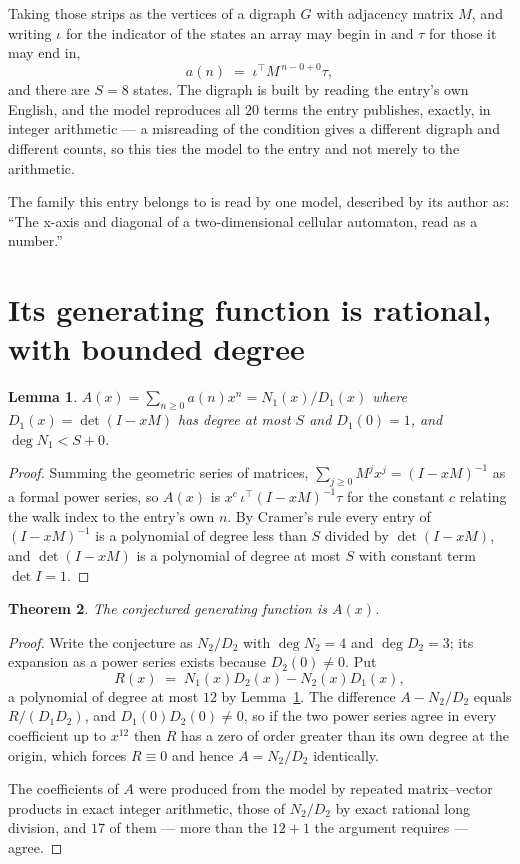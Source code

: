 \documentclass[11pt,a4paper]{article}
\theoremstyle{plain}
\newtheorem{theorem}{Theorem}
\newtheorem{lemma}[theorem]{Lemma}
\theoremstyle{definition}
\begin{document}
Taking those strips as the vertices of a digraph $G$ with adjacency matrix $M$, and writing
$\iota$ for the indicator of the states an array may begin in and $\tau$ for those it may end
in,
\[
a(n)\;=\;\iota^{\!\top}M^{\,n-0+0}\tau ,
\]
and there are $S=8$ states. The digraph is built by reading the entry's own English, and the
model reproduces all $20$ terms the entry publishes, exactly, in integer arithmetic --- a
misreading of the condition gives a different digraph and different counts, so this ties the
model to the entry and not merely to the arithmetic.

The family this entry belongs to is read by one model, described by its author as: ``The x-axis and diagonal of a two-dimensional cellular automaton, read as a number.''


\section{Its generating function is rational, with bounded degree}

\begin{lemma}\label{lem:rat}
$A(x)=\sum_{n\ge0}a(n)x^n=N_1(x)/D_1(x)$ where $D_1(x)=\det(I-xM)$ has degree at most
$S$ and $D_1(0)=1$, and $\deg N_1<S+0$.
\end{lemma}

\begin{proof}
Summing the geometric series of matrices, $\sum_{j\ge0}M^jx^j=(I-xM)^{-1}$ as a formal
power series, so $A(x)$ is $x^{c}\,\iota^{\!\top}(I-xM)^{-1}\tau$ for the constant $c$
relating the walk index to the entry's own $n$. By Cramer's rule every entry of
$(I-xM)^{-1}$ is a polynomial of degree less than $S$ divided by $\det(I-xM)$, and
$\det(I-xM)$ is a polynomial of degree at most $S$ with constant term $\det I=1$.
\end{proof}

\begin{theorem}
The conjectured generating function is $A(x)$.
\end{theorem}

\begin{proof}
Write the conjecture as $N_2/D_2$ with $\deg N_2=4$ and $\deg D_2=3$; its expansion as a
power series exists because $D_2(0)\neq0$. Put
\[
R(x)\;=\;N_1(x)D_2(x)-N_2(x)D_1(x),
\]
a polynomial of degree at most $12$ by Lemma~\ref{lem:rat}. The difference
$A-N_2/D_2$ equals $R/(D_1D_2)$, and $D_1(0)D_2(0)\neq0$, so if the two power series agree in
every coefficient up to $x^{12}$ then $R$ has a zero of order greater than its own
degree at the origin, which forces $R\equiv0$ and hence $A=N_2/D_2$ identically.

The coefficients of $A$ were produced from the model by repeated matrix--vector products in
exact integer arithmetic, those of $N_2/D_2$ by exact rational long division, and $17$
of them --- more than the $12+1$ the argument requires --- agree.
\end{proof}
\end{document}

